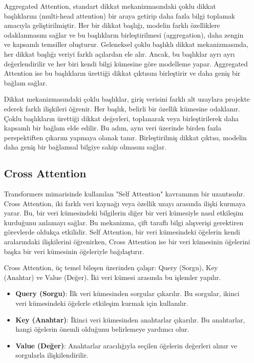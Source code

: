 Aggregated Attention, standart dikkat mekanizmasındaki çoklu dikkat başlıklarını (multi-head attention) bir araya getirip daha fazla bilgi toplamak amacıyla geliştirilmiştir. Her bir dikkat başlığı, modelin farklı özelliklere odaklanmasını sağlar ve bu başlıkların birleştirilmesi (aggregation), daha zengin ve kapsamlı temsiller oluşturur. Geleneksel çoklu başlıklı dikkat mekanizmasında, her dikkat başlığı veriyi farklı açılardan ele alır. Ancak, bu başlıklar ayrı ayrı değerlendirilir ve her biri kendi bilgi kümesine göre modelleme yapar. Aggregated Attention ise bu başlıkların ürettiği dikkat çıktısını birleştirir ve daha geniş bir bağlam sağlar.

Dikkat mekanizmasındaki çoklu başlıklar, giriş verisini farklı alt uzaylara projekte ederek farklı ilişkileri öğrenir. Her başlık, belirli bir özellik kümesine odaklanır. Çoklu başlıkların ürettiği dikkat değerleri, toplanarak veya birleştirilerek daha kapsamlı bir bağlam elde edilir. Bu adım, aynı veri üzerinde birden fazla perspektiften çıkarım yapmaya olanak tanır. Birleştirilmiş dikkat çıktısı, modelin daha geniş bir bağlamsal bilgiye sahip olmasını sağlar.

\newpage

\subsection{Cross Attention}

Transformers mimarisinde kullanılan "Self Attention" kavramının bir uzantısıdır. Cross Attention, iki farklı veri kaynağı veya özellik uzayı arasında ilişki kurmaya yarar. Bu, bir veri kümesindeki bilgilerin diğer bir veri kümesiyle nasıl etkileşim kurduğunu anlamayı sağlar. Bu mekanizma, çift taraflı bilgi alışverişi gerektiren görevlerde oldukça etkilidir. Self Attention, bir veri kümesindeki öğelerin kendi aralarındaki ilişkilerini öğrenirken, Cross Attention ise bir veri kümesinin öğelerini başka bir veri kümesinin öğeleriyle bağdaştırır.

Cross Attention, üç temel bileşen üzerinden çalışır: Query (Sorgu), Key (Anahtar) ve Value (Değer). İki veri kümesi arasında bu işlemler yapılır.

\begin{itemize}
    \item \textbf{Query (Sorgu)}: İlk veri kümesinden sorgular çıkarılır. Bu sorgular, ikinci veri kümesindeki öğelerle etkileşim kurmak için kullanılır.
    \item \textbf{Key (Anahtar)}: İkinci veri kümesinden anahtarlar çıkarılır. Bu anahtarlar, hangi öğelerin önemli olduğunu belirlemeye yardımcı olur.
    \item \textbf{Value (Değer)}: Anahtarlar aracılığıyla seçilen öğelerin değerleri alınır ve sorgularla ilişkilendirilir.
\end{itemize}

